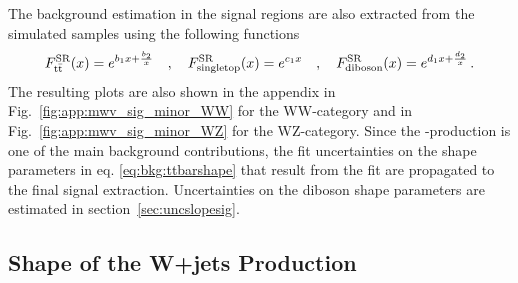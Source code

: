\noindent The background estimation in the signal regions are also extracted from the simulated samples using the following functions
\begin{equation}
F_{\mathrm{t}\bar{\mathrm{t}}}^{\rm SR}(x) = e^{b_1x+\frac{b_2}{x}} \quad , \quad \label{eq:bkg:ttbarshape}
F_{\rm singletop}^{\rm SR}(x) = e^{c_1x} \quad , \quad 
F_{\rm diboson}^{\rm SR}(x) = e^{d_1x+\frac{d_2}{x}} \, .
\end{equation}
The resulting plots are also shown in the appendix in Fig.~\ref{fig:app:mwv_sig_minor_WW} for the WW-category and in Fig.~\ref{fig:app:mwv_sig_minor_WZ} for the WZ-category. Since the \ttbar -production is one of the main background contributions, the fit uncertainties on the shape parameters in eq. \ref{eq:bkg:ttbarshape} that result from the fit are propagated to the final signal extraction. Uncertainties on the diboson shape parameters are estimated in section~\ref{sec:uncslopesig}.

\subsection{Shape of the W+jets Production}

